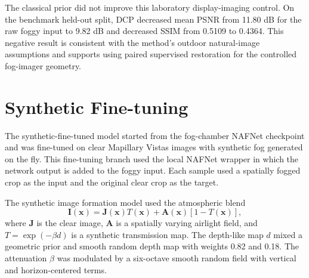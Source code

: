 \documentclass[9pt]{osa-supplemental-document}
\begin{document}
\begin{table}[htbp]
\centering
\scriptsize
\caption{Classical dark-channel-prior baseline on the 552-image benchmark held-out split. Input metrics compare the raw foggy image to the aligned clear target; DCP metrics compare the dark-channel-prior output to the same target.}
\label{tabS:dcp_baseline}
\end{table}

The classical prior did not improve this laboratory display-imaging control. On the benchmark held-out split, DCP decreased mean PSNR from 11.80 dB for the raw foggy input to 9.82 dB and decreased SSIM from 0.5109 to 0.4364. This negative result is consistent with the method's outdoor natural-image assumptions and supports using paired supervised restoration for the controlled fog-imager geometry.

\FloatBarrier

\section{Synthetic Fine-tuning}

The synthetic-fine-tuned model started from the fog-chamber NAFNet checkpoint and was fine-tuned on clear Mapillary Vistas images with synthetic fog generated on the fly. This fine-tuning branch used the local NAFNet wrapper in which the network output is added to the foggy input. Each sample used a spatially fogged crop as the input and the original clear crop as the target.

The synthetic image formation model used the atmospheric blend
\begin{equation}
\mathbf{I}(\mathbf{x}) =
\mathbf{J}(\mathbf{x})T(\mathbf{x}) +
\mathbf{A}(\mathbf{x})[1 - T(\mathbf{x})],
\label{eqS:synthetic_atmospheric_blend}
\end{equation}
where $\mathbf{J}$ is the clear image, $\mathbf{A}$ is a spatially varying airlight field, and $T=\exp(-\beta d)$ is a synthetic transmission map. The depth-like map $d$ mixed a geometric prior and smooth random depth map with weights 0.82 and 0.18. The attenuation $\beta$ was modulated by a six-octave smooth random field with vertical and horizon-centered terms.
\end{document}
